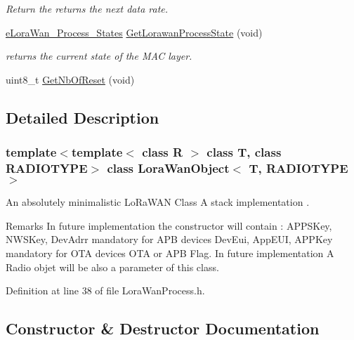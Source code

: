 \begin{DoxyCompactItemize}
\begin{DoxyCompactList}\small\item\em Return the returns the next data rate. \end{DoxyCompactList}\item 
\mbox{\hyperlink{_define_8h_acabcd539e4bcc6575c90bd7d857b21f4}{e\+Lora\+Wan\+\_\+\+Process\+\_\+\+States}} \mbox{\hyperlink{class_lora_wan_object_add21dc9bc142938b0b37f958f6874100}{Get\+Lorawan\+Process\+State}} (void)
\begin{DoxyCompactList}\small\item\em returns the current state of the M\+AC layer. \end{DoxyCompactList}\item 
uint8\+\_\+t \mbox{\hyperlink{class_lora_wan_object_a3432781cfedda764c71fa2839c54a9bd}{Get\+Nb\+Of\+Reset}} (void)
\end{DoxyCompactItemize}


\subsection{Detailed Description}
\subsubsection*{template$<$template$<$ class R $>$ class T, class R\+A\+D\+I\+O\+T\+Y\+PE$>$\newline
class Lora\+Wan\+Object$<$ T, R\+A\+D\+I\+O\+T\+Y\+P\+E $>$}

An absolutely minimalistic Lo\+Ra\+W\+AN Class A stack implementation . 

\begin{DoxyRemark}{Remarks}
In future implementation the constructor will contain \+: A\+P\+P\+S\+Key, N\+W\+S\+Key, Dev\+Adrr mandatory for A\+PB devices Dev\+Eui, App\+E\+UI, A\+P\+P\+Key mandatory for O\+TA devices O\+TA or A\+PB Flag. In future implementation A Radio objet will be also a parameter of this class. 
\end{DoxyRemark}


Definition at line 38 of file Lora\+Wan\+Process.\+h.



\subsection{Constructor \& Destructor Documentation}
\mbox{\label{class_lora_wan_object_a87c736c95588e388ae5c2475220827c4}} 
